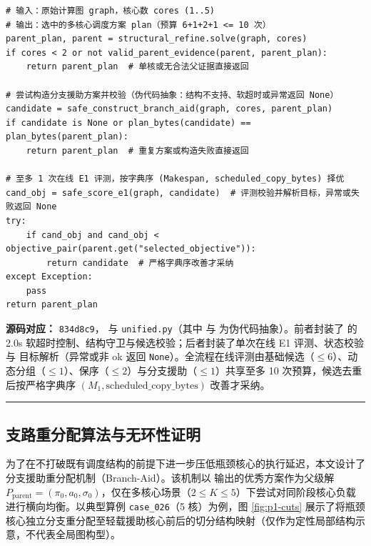 \documentclass[anonymous,withtoc]{gmcm2026}
\begin{document}
\begin{lstlisting}[style=paperpseudo]
# 输入：原始计算图 graph，核心数 cores (1..5)
# 输出：选中的多核心调度方案 plan（预算 6+1+2+1 <= 10 次）
parent_plan, parent = structural_refine.solve(graph, cores)
if cores < 2 or not valid_parent_evidence(parent, parent_plan):
    return parent_plan  # 单核或无合法父证据直接返回

# 尝试构造分支援助方案并校验（伪代码抽象：结构不支持、软超时或异常返回 None）
candidate = safe_construct_branch_aid(graph, cores, parent_plan)
if candidate is None or plan_bytes(candidate) == plan_bytes(parent_plan):
    return parent_plan  # 重复方案或构造失败直接返回

# 至多 1 次在线 E1 评测，按字典序 (Makespan, scheduled_copy_bytes) 择优
cand_obj = safe_score_e1(graph, candidate)  # 评测校验并解析目标，异常或失败返回 None
try:
    if cand_obj and cand_obj < objective_pair(parent.get("selected_objective")):
        return candidate  # 严格字典序改善才采纳
except Exception:
    pass
return parent_plan
\end{lstlisting}
\textbf{源码对应：} \texttt{834d8c9}，\texttt{} 与 \texttt{unified.py}（其中 \texttt{} 与 \texttt{} 为伪代码抽象）。前者封装了 \texttt{} 的 2.0s 软超时控制、结构守卫与候选校验；后者封装了单次在线 E1 评测、状态校验与 \texttt{} 目标解析（异常或非 ok 返回 \texttt{None}）。全流程在线评测由基础候选（\(\le 6\)）、动态分组（\(\le 1\)）、保序（\(\le 2\)）与分支援助（\(\le 1\)）共享至多 10 次预算，候选去重后按严格字典序 \((M_1, \text{scheduled\_copy\_bytes})\) 改善才采纳。

\par\hrule\endgroup

\subsection{支路重分配算法与无环性证明}

为了在不打破既有调度结构的前提下进一步压低瓶颈核心的执行延迟，本文设计了分支援助重分配机制（Branch-Aid）。该机制以 \texttt{} 输出的优秀方案作为父级解 \(P_{\mathrm{parent}} = (\pi_0, a_0, \sigma_0)\)，仅在多核心场景（\(2 \le K \le 5\)）下尝试对同阶段核心负载进行横向均衡。以典型算例 \texttt{case\_026}（5 核）为例，图 \ref{fig:p1-cuts} 展示了将瓶颈核心独立分支重分配至轻载援助核心前后的切分结构映射（仅作为定性局部结构示意，不代表全局图构型）。
\end{document}
